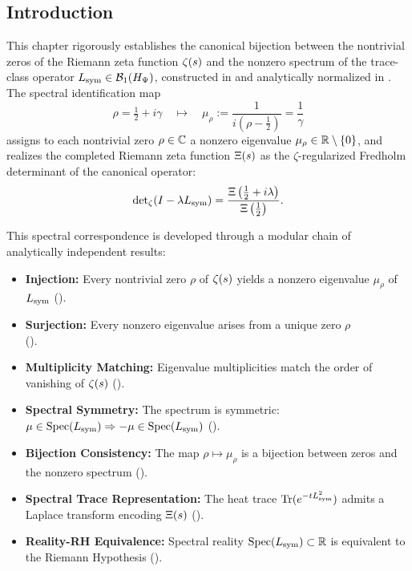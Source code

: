 \subsection*{Introduction}
\label{sec:intro_spectral_correspondence}

This chapter rigorously establishes the canonical bijection between the nontrivial zeros of the Riemann zeta function \(\zeta(s)\) and the nonzero spectrum of the trace-class operator \(L_{\mathrm{sym}} \in \mathcal{B}_1(H_{\Psi})\), constructed in  and analytically normalized in . The spectral identification map
\[
\rho = \tfrac{1}{2} + i\gamma \quad \longmapsto \quad \mu_\rho := \frac{1}{i(\rho - \tfrac{1}{2})} = \frac{1}{\gamma}
\]
assigns to each nontrivial zero \(\rho \in \mathbb{C}\) a nonzero eigenvalue \(\mu_\rho \in \mathbb{R} \setminus \{0\}\), and realizes the completed Riemann zeta function \(\Xi(s)\) as the \(\zeta\)-regularized Fredholm determinant of the canonical operator:
\[
\det\nolimits_\zeta(I - \lambda L_{\mathrm{sym}}) = \frac{\Xi\left( \tfrac{1}{2} + i\lambda \right)}{\Xi\left( \tfrac{1}{2} \right)}.
\]

\medskip

\noindent
This spectral correspondence is developed through a modular chain of analytically independent results:

\begin{itemize}
  \item \textbf{Injection:} Every nontrivial zero \(\rho\) of \(\zeta(s)\) yields a nonzero eigenvalue \(\mu_\rho\) of \(L_{\mathrm{sym}}\) ().
  
  \item \textbf{Surjection:} Every nonzero eigenvalue arises from a unique zero \(\rho\)\\ ().
  
  \item \textbf{Multiplicity Matching:} Eigenvalue multiplicities match the order of vanishing of \(\zeta(s)\) ().
  
  \item \textbf{Spectral Symmetry:} The spectrum is symmetric: \( \mu \in \operatorname{Spec}(L_{\mathrm{sym}}) \Rightarrow -\mu \in \operatorname{Spec}(L_{\mathrm{sym}}) \) ().
  
  \item \textbf{Bijection Consistency:} The map \( \rho \mapsto \mu_\rho \) is a bijection between zeros and the nonzero spectrum ().
  
  \item \textbf{Spectral Trace Representation:} The heat trace \( \operatorname{Tr}(e^{-t L_{\mathrm{sym}}^2}) \) admits a Laplace transform encoding \( \Xi(s) \) ().
  
  \item \textbf{Reality-RH Equivalence:} Spectral reality \( \operatorname{Spec}(L_{\mathrm{sym}}) \subset \mathbb{R} \) is equivalent to the Riemann Hypothesis ().
\end{itemize}

